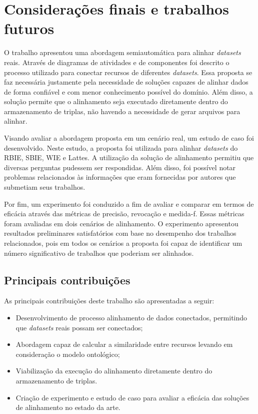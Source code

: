 \chapter{Considerações finais e trabalhos futuros}
\label{cap:conclusao}
O trabalho apresentou uma abordagem semiautomática para alinhar \textit{datasets} reais. Através de diagramas de atividades e de componentes foi descrito o processo utilizado para conectar recursos de diferentes \textit{datasets}. Essa proposta se faz necessária justamente pela necessidade de soluções capazes de alinhar dados de forma confiável e com menor conhecimento possível do domínio. Além disso, a solução permite que o alinhamento seja executado diretamente dentro do armazenamento de triplas, não havendo a necessidade de gerar arquivos para alinhar. 

Visando avaliar a abordagem proposta em um cenário real, um estudo de caso foi desenvolvido. Neste estudo, a proposta foi utilizada para alinhar \textit{datasets} do RBIE, SBIE, WIE e Lattes. A utilização da solução de alinhamento permitiu que diversas perguntas pudessem ser respondidas. Além disso, foi possível notar problemas relacionados às informações que eram fornecidas por autores que submetiam seus trabalhos.

Por fim, um experimento foi conduzido  a fim de avaliar e comparar em termos de eficácia através das métricas de precisão, revocação e medida-f. Essas métricas foram avaliadas em dois cenários de alinhamento. O experimento apresentou resultados preliminares satisfatórios com base no desempenho dos trabalhos relacionados, pois em todos os cenários a proposta foi capaz de identificar um número significativo de trabalhos que poderiam ser alinhados. 

\section{Principais contribuições}
As principais contribuições deste trabalho são apresentadas a seguir:
\begin{itemize}
\item Desenvolvimento de processo alinhamento de dados conectados, permitindo que \textit{datasets} reais possam ser conectados;
\item Abordagem capaz de calcular a similaridade entre recursos levando em consideração o modelo ontológico;
\item Viabilização da execução do alinhamento diretamente dentro do armazenamento de triplas.
\item  Criação de experimento e estudo de caso para avaliar a eficácia das soluções de alinhamento no estado da arte.
\end{itemize}


